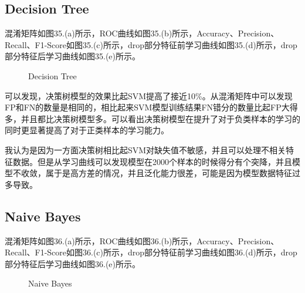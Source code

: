 \documentclass[../main.tex]{subfiles}
\begin{document}
    \subsection{Decision Tree}

    混淆矩阵如图35.(a)所示，ROC曲线如图35.(b)所示，Accuracy、Precision、Recall、F1-Score如图35.(c)所示，drop部分特征前学习曲线如图35.(d)所示，drop部分特征后学习曲线如图35.(e)所示。

        \begin{figure}[H]
            \centering


            \caption{Decision Tree}
        \end{figure}

        可以发现，决策树模型的效果比起SVM提高了接近10\%。从混淆矩阵中可以发现FP和FN的数量是相同的，相比起来SVM模型训练结果FN错分的数量比起FP大得多，并且都比决策树模型多。可以看出决策树模型在提升了对于负类样本的学习的同时更显著提高了对于正类样本的学习能力。

        我认为是因为一方面决策树相比起SVM对缺失值不敏感，并且可以处理不相关特征数据。但是从学习曲线可以发现模型在2000个样本的时候得分有个突降，并且模型不收敛，属于是高方差的情况，并且泛化能力很差，可能是因为模型数据特征过多导致。

    \subsection{Naive Bayes}

        混淆矩阵如图36.(a)所示，ROC曲线如图36.(b)所示，Accuracy、Precision、Recall、F1-Score如图36.(c)所示，drop部分特征前学习曲线如图36.(d)所示，drop部分特征后学习曲线如图36.(e)所示。

        \begin{figure}[H]
            \centering


            \caption{Naive Bayes}
        \end{figure}
\end{document}
